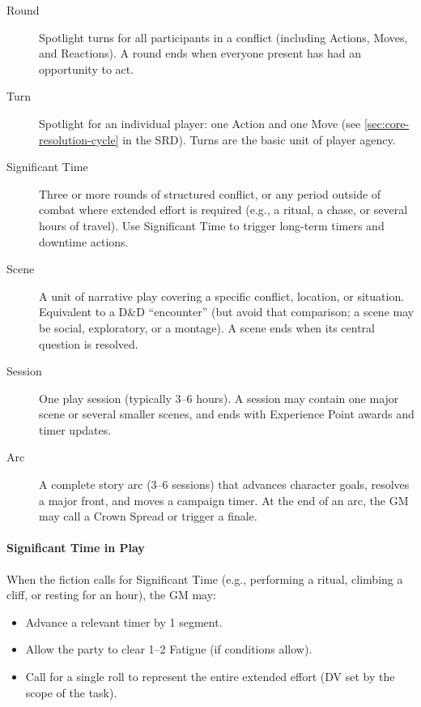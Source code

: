 \begin{description}
\item[Round] Spotlight turns for all participants in a conflict (including Actions, Moves, and Reactions). A round ends when everyone present has had an opportunity to act.
\item[Turn] Spotlight for an individual player: one Action and one Move (see \ref{sec:core-resolution-cycle} in the SRD). Turns are the basic unit of player agency.
\item[Significant Time] Three or more rounds of structured conflict, or any period outside of combat where extended effort is required (e.g., a ritual, a chase, or several hours of travel). Use Significant Time to trigger long-term timers and downtime actions.
\item[Scene] A unit of narrative play covering a specific conflict, location, or situation. Equivalent to a D\&D ``encounter'' (but avoid that comparison; a scene may be social, exploratory, or a montage). A scene ends when its central question is resolved.
\item[Session] One play session (typically 3--6 hours). A session may contain one major scene or several smaller scenes, and ends with Experience Point awards and timer updates.
\item[Arc] A complete story arc (3--6 sessions) that advances character goals, resolves a major front, and moves a campaign timer. At the end of an arc, the GM may call a Crown Spread or trigger a finale.
\end{description}

\paragraph{Significant Time in Play}
When the fiction calls for Significant Time (e.g., performing a ritual, climbing a cliff, or resting for an hour), the GM may:
\begin{itemize}
  \item Advance a relevant timer by 1 segment.
  \item Allow the party to clear 1--2 Fatigue (if conditions allow).
  \item Call for a single roll to represent the entire extended effort (DV set by the scope of the task).
\end{itemize}

